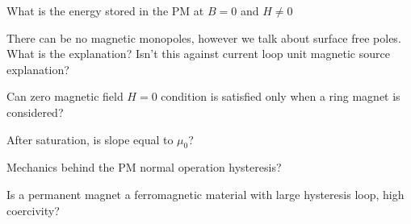 
What is the energy stored in the PM at $B=0$ and $H \neq 0$

There can be no magnetic monopoles, however we talk about surface free poles. What is the explanation? Isn't this against current loop unit magnetic source explanation?


Can zero magnetic field $H=0$ condition is satisfied only when a ring magnet is considered?


After saturation, is slope equal to $\mu_{0}$?


Mechanics behind the PM normal operation hysteresis?

Is a permanent magnet a ferromagnetic material with large hysteresis loop, high coercivity?
